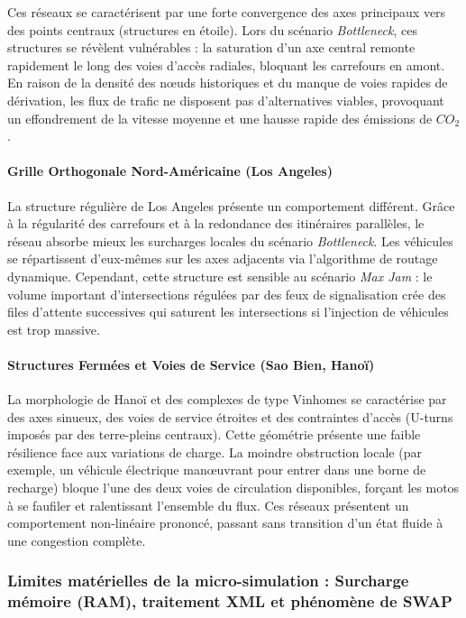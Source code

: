 \documentclass[10pt, a4paper]{article}
\begin{document}
Ces réseaux se caractérisent par une forte convergence des axes
principaux vers des points centraux (structures en étoile). Lors du
scénario \emph{Bottleneck}, ces structures se révèlent vulnérables : la
saturation d'un axe central remonte rapidement le long des voies d'accès
radiales, bloquant les carrefours en amont. En raison de la densité des
nœuds historiques et du manque de voies rapides de dérivation, les flux
de trafic ne disposent pas d'alternatives viables, provoquant un
effondrement de la vitesse moyenne et une hausse rapide des émissions de
\(CO_2\).

\paragraph{Grille Orthogonale Nord-Américaine (Los
Angeles)}\label{grille-orthogonale-nord-amuxe9ricaine-los-angeles}

La structure régulière de Los Angeles présente un comportement
différent. Grâce à la régularité des carrefours et à la redondance des
itinéraires parallèles, le réseau absorbe mieux les surcharges locales
du scénario \emph{Bottleneck}. Les véhicules se répartissent d'eux-mêmes
sur les axes adjacents via l'algorithme de routage dynamique. Cependant,
cette structure est sensible au scénario \emph{Max Jam} : le volume
important d'intersections régulées par des feux de signalisation crée
des files d'attente successives qui saturent les intersections si
l'injection de véhicules est trop massive.

\paragraph{Structures Fermées et Voies de Service (Sao Bien,
Hanoï)}\label{structures-fermuxe9es-et-voies-de-service-sao-bien-hanouxef}

La morphologie de Hanoï et des complexes de type Vinhomes se caractérise
par des axes sinueux, des voies de service étroites et des contraintes
d'accès (U-turns imposés par des terre-pleins centraux). Cette géométrie
présente une faible résilience face aux variations de charge. La moindre
obstruction locale (par exemple, un véhicule électrique manœuvrant pour
entrer dans une borne de recharge) bloque l'une des deux voies de
circulation disponibles, forçant les motos à se faufiler et ralentissant
l'ensemble du flux. Ces réseaux présentent un comportement non-linéaire
prononcé, passant sans transition d'un état fluide à une congestion
complète.

\subsubsection{Limites matérielles de la micro-simulation : Surcharge
mémoire (RAM), traitement XML et phénomène de
SWAP}\label{limites-matuxe9rielles-de-la-micro-simulation-surcharge-muxe9moire-ram-traitement-xml-et-phuxe9nomuxe8ne-de-swap}
\end{document}
